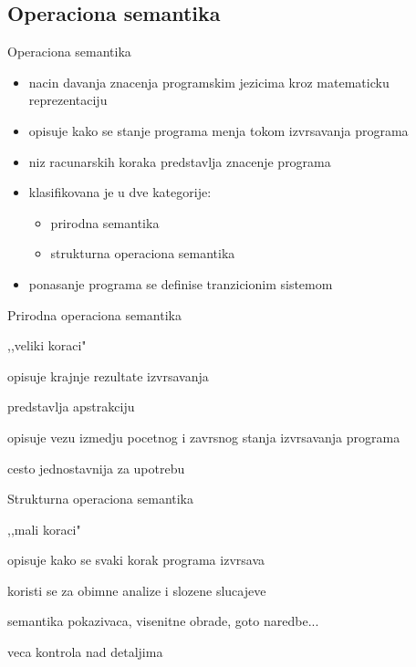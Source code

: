 \documentclass{beamer}
\begin{document}
\subsection{Operaciona semantika}
\begin{frame}{Operaciona semantika}
 	\begin{itemize}
  		\item nacin davanja znacenja programskim jezicima kroz matematicku reprezentaciju
		\item opisuje kako se stanje programa menja tokom izvrsavanja programa
		\item niz racunarskih koraka predstavlja znacenje programa
		\item klasifikovana je u dve kategorije: 
			\begin{itemize}
				\item prirodna semantika
				\item strukturna operaciona semantika
			\end{itemize}
		\item ponasanje programa se definise tranzicionim sistemom
 	\end{itemize}
\end{frame}

\begin{frame}{Prirodna operaciona semantika}
 	\item ,,veliki koraci"
 	\item opisuje krajnje rezultate izvrsavanja
 	\item predstavlja apstrakciju
 	\item opisuje vezu izmedju pocetnog i zavrsnog stanja izvrsavanja programa
 	\item cesto jednostavnija za upotrebu
\end{frame}

\begin{frame}{Strukturna operaciona semantika}
	\item ,,mali koraci"
	\item  opisuje kako se svaki korak programa izvrsava
	\item koristi se za obimne analize i slozene slucajeve
	\item semantika pokazivaca, visenitne obrade, goto naredbe...
	\item veca kontrola nad detaljima
\end{frame}
\end{document}
